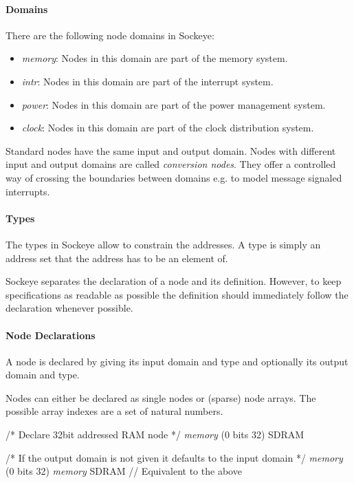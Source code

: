 \documentclass[a4paper,11pt,twoside]{report}
\begin{document}
{{{\paragraph{Domains}
There are the following node domains in Sockeye:
\begin{itemize}
  \item \textit{memory}: Nodes in this domain are part of the memory system. 
  \item \textit{intr}: Nodes in this domain are part of the interrupt system.
  \item \textit{power}: Nodes in this domain are part of the power management system.
  \item \textit{clock}: Nodes in this domain are part of the clock distribution system.
\end{itemize}
Standard nodes have the same input and output domain.
Nodes with different input and output domains are called \emph{conversion nodes}.
They offer a controlled way of crossing the boundaries between domains e.g. to model message signaled interrupts.

\paragraph{Types} The types in Sockeye allow to constrain the addresses.
A type is simply an address set that the address has to be an element of.

Sockeye separates the declaration of a node and its definition.
However, to keep specifications as readable as possible the definition should immediately follow the declaration whenever possible.

\paragraph{Node Declarations} A node is declared by giving its input domain and type and optionally its output domain and type.

Nodes can either be declared as single nodes or (sparse) node arrays.
The possible array indexes are a set of natural numbers.
\begin{example}
  /* Declare 32bit addressed RAM node */
  \textit{memory} (0 bits 32) SDRAM

  /* If the output domain is not given it defaults to the input domain */
  \textit{memory} (0 bits 32) \textit{memory} SDRAM // Equivalent to the above


\end{example}}}}
\end{document}
